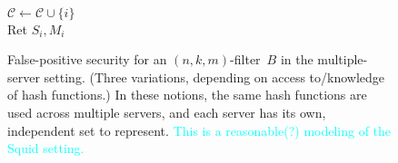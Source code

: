 \begin{figure}
{{\medskip
{}\\
$\mathcal{C} \gets \mathcal{C} \cup \{i\}$\\
Ret $S_i,M_i$\\
}
}
\caption{False-positive security for an $(n,k,m)$-filter~$B$ in the multiple-server setting.  (Three variations, depending on access to/knowledge of hash functions.) In these notions, the same hash functions are used across multiple servers, and each server has its own, independent set to represent. \textcolor{cyan}{This is a reasonable(?) modeling of the Squid setting.}}
\label{fig:fp-filter}
\end{figure}